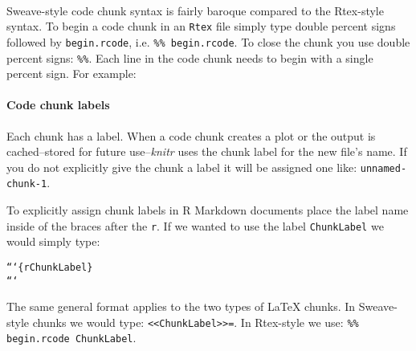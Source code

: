 { \\[0.25cm]

Sweave-style code chunk syntax is fairly baroque compared to the Rtex-style syntax. To begin a code chunk in an \texttt{Rtex} file simply type double percent signs followed by \texttt{begin.rcode}, i.e. \texttt{\%\% begin.rcode}. To close the chunk you use double percent signs: \texttt{\%\%}. Each line in the code chunk needs to begin with a single percent sign. For example:

\begin{knitrout}
\color{fgcolor}\begin{kframe}
\begin{alltt}
%% begin.rcode
% \hlcomment{# Example of a Rtex-style code chunk}
% StringNumObject <- \hlfunctioncall{cbind}(CharacterVect, NumericVect)
%%
\end{alltt}
\end{kframe}
\end{knitrout}


\paragraph{Code chunk labels}

Each chunk has a label. When a code chunk creates a plot or the output is cached--stored for future use--{\emph{knitr}} uses the chunk label for the new file's name. If you do not explicitly give the chunk a label it will be assigned one like: \texttt{unnamed-chunk-1}.

To explicitly assign chunk labels in R Markdown documents place the label name inside of the braces after the \texttt{r}. If we wanted to use the label \texttt{ChunkLabel} we would simply type:

\begin{knitrout}
\color{fgcolor}\begin{kframe}
\begin{alltt}
```\{r ChunkLabel\}
```
\end{alltt}
\end{kframe}
\end{knitrout}


\noindent The same general format applies to the two types of LaTeX chunks. In Sweave-style chunks we would type: \texttt{\textless\textless ChunkLabel\textgreater\textgreater=}. In Rtex-style we use: \texttt{\%\% begin.rcode ChunkLabel}.

}
